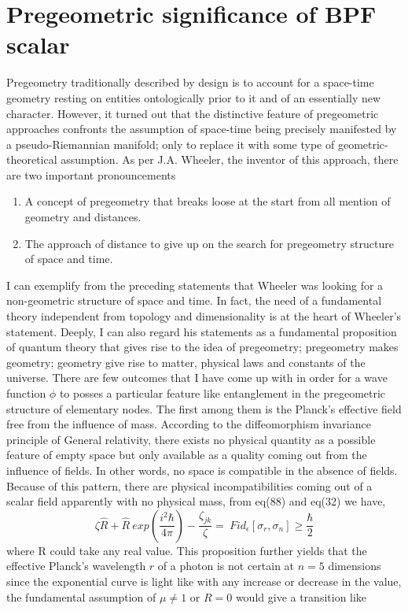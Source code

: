 \documentclass{article}
\begin{document}
\section{Pregeometric significance of BPF scalar }
Pregeometry traditionally described by design is to account for a space-time geometry resting on entities ontologically prior to it and of an essentially new character\cite{20}. However, it turned out that the distinctive feature of pregeometric approaches confronts the assumption of space-time being precisely manifested by a pseudo-Riemannian manifold; only to replace it with some type of geometric-theoretical assumption. \newline 
As per J.A. Wheeler, the inventor of this approach, there are two important pronouncements \begin{enumerate}
\item A concept of pregeometry that breaks loose at the start from all mention of geometry and distances.
\item The approach of distance to give up on the search for pregeometry structure of space and time.
\end{enumerate}
I can exemplify from the preceding statements that Wheeler was looking for a non-geometric structure of space and time. In fact, the need of a fundamental theory independent from topology and dimensionality is at the heart of Wheeler's statement. Deeply, I can also regard his statements as a fundamental proposition of quantum theory that gives rise to the idea of pregeometry; pregeometry makes geometry; geometry give rise to matter, physical laws
and constants of the universe. \vspace{4mm} \newline
There are few outcomes that I have come up with in order for a wave function $\phi$ to posses a particular feature like entanglement in the pregeometric structure of elementary nodes. The first among them is the Planck's effective field free from the influence of mass. According to the diffeomorphism invariance principle of General relativity, there exists no physical quantity as a possible feature of empty space but only available as a quality coming out from the influence of fields. In other words, no space is compatible in the absence of fields. Because of this pattern, there are physical incompatibilities coming out of a scalar field apparently with no physical mass, from eq(88) and eq(32) we have,
\begin{equation}
\zeta \hat R + \hat R\ exp(\frac{i^2 \hbar}{4 \pi}) - \frac{\zeta_{jk}}{\zeta} = \ Fid_\epsilon [\sigma_r ,\sigma_n] \geq \frac{\hbar}{2}
\end{equation} where R could take any real value. This proposition further yields that the effective Planck's wavelength $r$ of a photon is not certain at $n=5$ dimensions since the exponential curve is light like with any increase or decrease in the value, the fundamental assumption of $\mu \neq 1$ or $R=0$ would give a transition like
\end{document}
